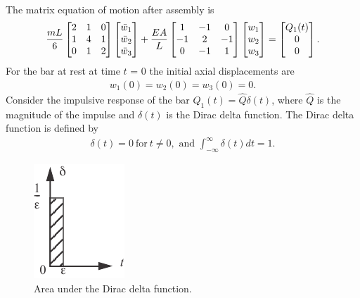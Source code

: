 \documentclass{AeroStructure-ERJohnson}
\begin{document}
\begin{example*}
\begin{align}
\end{align}
The matrix equation of motion after assembly is
\begin{align}\label{ex18.2c}
\frac{m L}{6}\left[\begin{array}{@{}ccc@{}}2 & 1 & 0 \\1 & 4 & 1 \\0 & 1 & 2\end{array}\right]\left[\begin{array}{@{}c@{}}\ddot{w}_{1} \\\ddot{w}_{2} \\\ddot{w}_{3}\end{array}\right]+\frac{E A}{L}\left[\begin{array}{@{}ccc@{}}1 & -1 & 0 \\-1 & 2 & -1 \\0 & -1 & 1\end{array}\right]\left[\begin{array}{@{}c@{}}w_{1} \\w_{2} \\w_{3}\end{array}\right]=\left[\begin{array}{@{}c@{}}Q_{1}(t) \\0 \\0\end{array}\right].
\end{align}
For the bar at rest at time $t$ = 0 the initial axial displacements are
\begin{align}\label{ex18.2d}
w_{1}(0)=w_{2}(0)=w_{3}(0)=0.
\end{align}
Consider the impulsive response of the bar $Q_{1}(t)=\hat{Q} \delta(t)$, where $\hat{Q}$ is the magnitude of the impulse and $\delta(t)$ is the Dirac delta function. The Dirac delta function is defined by
\begin{align}\label{ex18.2e}
\delta(t)=0\ \text{for}\ t \neq 0,\text{ and }\int_{-\infty}^{\infty} \delta(t) d t=1.
\end{align}

\begin{figure}
\vspace{-19pt}
\includegraphics{Figure_18-12.pdf}
\caption{Area under the Dirac delta function.\label{fig18.12}}
\end{figure}


\end{example*}
\end{document}
